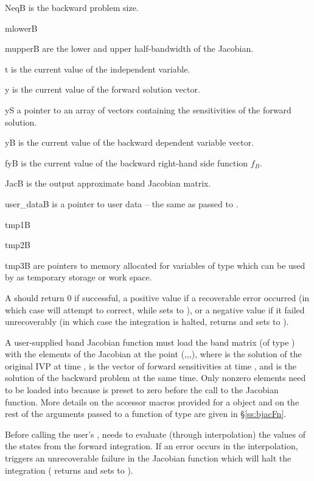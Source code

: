 {
  \begin{args}
  \item[NeqB]
    is the backward problem size.
  \item[mlowerB]
  \item[mupperB]
    are the lower and upper half-bandwidth of the Jacobian.
  \item[t]
    is the current value of the independent variable.
  \item[y]
    is the current value of the forward solution vector.
  \item[yS]
    a pointer to an array of  vectors containing the sensitivities
    of the forward solution.
  \item[yB]
    is the current value of the backward dependent variable vector.
  \item[fyB]
    is the current value of the backward right-hand side function $f_B$.
  \item[JacB]
    is the output approximate band Jacobian matrix. 
  \item[user\_dataB]
    is a pointer to user data -- the same as passed to . 
  \item[tmp1B]
  \item[tmp2B]
  \item[tmp3B]
    are pointers to memory allocated  for variables of type  which 
    can be used by  as temporary storage or work space.    
  \end{args}
}
{
  A  should return 0 if successful, a positive value if a recoverable
  error occurred (in which case {\cvodes} will attempt to correct, while {\cvband} sets
   to ), or a negative 
  value if it failed unrecoverably (in which case the integration is halted, 
  returns  and {\cvdense} sets  to 
  ).
}
{
  A user-supplied band Jacobian function must load the band matrix 
  (of type ) with the elements of the Jacobian at the
  point (,,,), where  is the solution
  of the original IVP at time ,  is the vector of forward
  sensitivities at time , and  is the solution of the
  backward problem at the same time.  
  Only nonzero elements need to be loaded into
   because  is preset to zero before the call to the
  Jacobian function. More details on the accessor macros provided for
  a  object and on the rest of the arguments passed to a function
  of type  are given in \S\ref{ss:bjacFn}.

  {\warn}Before calling the user's , {\cvodes} needs to evaluate
  (through interpolation) the values of the states from the forward integration. 
  If an error occurs in the interpolation, {\cvodes} triggers an unrecoverable
  failure in the Jacobian function which will halt the integration
  ( returns  and {\cvband} sets  to
  ).
}


